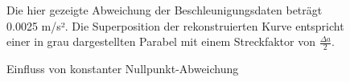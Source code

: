\begin{figure}[ht!]
\vspace{0.25cm}
\begin{center}
\caption{Einfluss von konstanter Nullpunkt-Abweichung}
\label{fig:SzeneOffset}
\end{center}

\vspace{0.25cm}
Die hier gezeigte Abweichung der Beschleunigungsdaten beträgt 0.0025 m/s². Die Superposition der rekonstruierten Kurve entspricht einer in grau dargestellten Parabel mit einem Streckfaktor von $\frac{\Delta a}{2}$.
\end{figure}










